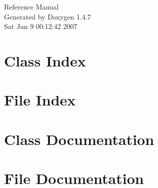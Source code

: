 \documentclass[a4paper]{book}
\begin{document}
\begin{titlepage}
\vspace*{7cm}
\begin{center}
{\Large Reference Manual}\\
\vspace*{1cm}
{\large Generated by Doxygen 1.4.7}\\
\vspace*{0.5cm}
{\small Sat Jun 9 00:12:42 2007}\\
\end{center}
\end{titlepage}
\clearemptydoublepage
{}
\tableofcontents
\clearemptydoublepage
{}
\chapter{Class Index}

\chapter{File Index}

\chapter{Class Documentation}







\chapter{File Documentation}






\printindex
\end{document}
